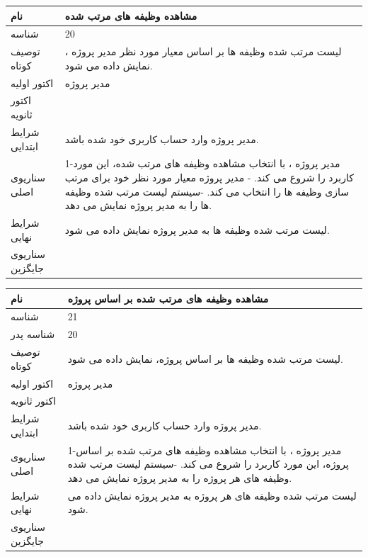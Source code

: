 \vspace{2cm}

\begin{tabular}{|p{2cm}|p{10cm}|}
\hline
نام
&
مشاهده وظیفه های مرتب شده
\\
\hline
شناسه
&
20
\\
\hline
توصیف کوتاه
&
لیست مرتب شده وظیفه ها بر اساس معیار مورد نظر مدیر پروژه ، نمایش داده می شود.
\\
\hline
اکتور اولیه
&
مدیر پروژه
\\
\hline
اکتور ثانویه
&

\\
\hline
شرایط ابتدایی
&
مدیر پروژه وارد حساب کاربری خود شده باشد. 
\\
\hline
سناریوی اصلی
&
1-مدیر پروژه ، با انتخاب مشاهده وظیفه های مرتب شده، این مورد کاربرد را شروع می کند.
\newline
2- مدیر پروژه معیار مورد نظر خود برای مرتب سازی وظیفه ها را انتخاب می کند. 
\newline
3-سیستم لیست مرتب شده وظیفه ها را به مدیر پروژه نمایش می دهد.
\\
\hline
شرایط نهایی
&
لیست مرتب شده وظیفه ها به مدیر پروژه نمایش داده می شود.
\\
\hline
سناریوی جایگزین
&

\\
\hline
\end{tabular}

\vspace{2cm}

\begin{tabular}{|p{2cm}|p{10cm}|}
\hline
نام
&
مشاهده وظیفه های مرتب شده بر اساس پروژه
\\
\hline
شناسه
&
21
\\
\hline
شناسه پدر
&
20
\\
\hline
توصیف کوتاه  
&
لیست مرتب شده وظیفه ها بر اساس پروژه، نمایش داده می شود.
\\
\hline
اکتور اولیه
&
مدیر پروژه
\\
\hline
اکتور ثانویه
&

\\
\hline
شرایط ابتدایی
&
مدیر پروژه وارد حساب کاربری خود شده باشد. 
\\
\hline
سناریوی اصلی
&
1-مدیر پروژه ، با انتخاب مشاهده وظیفه های مرتب شده بر اساس پروژه، این مورد کاربرد را شروع می کند.
\newline
2-سیستم لیست مرتب شده وظیفه های هر پروژه  را به مدیر پروژه نمایش می دهد.
\\
\hline
شرایط نهایی
&
لیست مرتب شده وظیفه های هر پروژه به مدیر پروژه نمایش داده می شود.
\\
\hline
سناریوی جایگزین
&

\\
\hline
\end{tabular}

